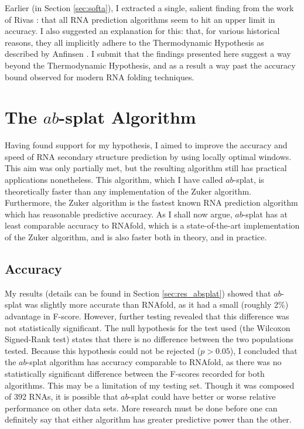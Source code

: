 \documentclass{cshonours}
\begin{document}
Earlier (in Section \ref{sec:softa}), I extracted a single, salient finding from the work of Rivas \cite{rivas2013four}: that all RNA prediction algorithms seem to hit an upper limit in accuracy. I also suggested an explanation for this: that, for various historical reasons, they all implicitly adhere to the Thermodynamic Hypothesis as described by Anfinsen \cite{anfinsen1973principles}. I submit that the findings presented here suggest a way beyond the Thermodynamic Hypothesis, and as a result a way past the accuracy bound observed for modern RNA folding techniques.


\section{The $ab$-splat Algorithm}

Having found support for my hypothesis, I aimed to improve the accuracy and speed of RNA secondary structure prediction by using locally optimal windows. This aim was only partially met, but the resulting algorithm still has practical applications nonetheless. This algorithm, which I have called $ab$-splat, is theoretically faster than any implementation of the Zuker algorithm. Furthermore, the Zuker algorithm is the fastest known RNA prediction algorithm which has reasonable predictive accuracy. As I shall now argue, $ab$-splat has at least comparable accuracy to RNAfold, which is a state-of-the-art implementation of the Zuker algorithm, and is also faster both in theory, and in practice.

\subsection{Accuracy}

My results (details can be found in Section \ref{sec:res_absplat}) showed that $ab$-splat was slightly more accurate than RNAfold, as it had a small (roughly 2\%) advantage in F-score. However, further testing revealed that this difference was not statistically significant. The null hypothesis for the test used (the Wilcoxon Signed-Rank test) states that there is no difference between the two populations tested. Because this hypothesis could not be rejected ($p > 0.05$), I concluded that the $ab$-splat algorithm has accuracy comparable to RNAfold, as there was no statistically significant difference between the F-scores recorded for both algorithms. This may be a limitation of my testing set. Though it was composed of 392 RNAs, it is possible that $ab$-splat could have better or worse relative performance on other data sets. More research must be done before one can definitely say that either algorithm has greater predictive power than the other.
\end{document}
